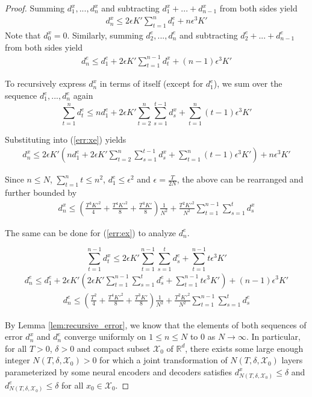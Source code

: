 \documentclass{article}
\def\gX{{\mathcal{X}}}
\newcommand{\R}{\mathbb{R}}
\newcommand{\e}{\epsilon}
\begin{document}
\begin{proof}
Summing $d^x_{1},...,d^x_{n}$ and subtracting $d^x_{1}+...+d^x_{n-1}$ from both sides yield
\begin{align}
d^x_n \leq 2\e K' \sum_{t=1}^n d^e_t + n\e^3K' \label{err:xe}
\end{align}
Note that $d^x_0=0$. 
Similarly, summing $d^e_{2},...,d^e_{n}$ and subtracting $d^e_{2}+...+d^e_{n-1}$ from both sides yield
\begin{align}
d^e_n \leq d^e_1 + 2\e K' \sum_{t=1}^{n-1} d^x_t + (n-1)\e^3K' \label{err:ex}
\end{align}

To recursively express $d^x_n$ in terms of itself (except for $d^e_1$), 
we sum over the sequence $d^e_{1},...,d^e_{n}$ again 
$$\sum_{t=1}^n d^e_t \leq n d^e_1 + 2\e K' \sum_{t=2}^n\sum_{s=1}^{t-1} d^x_s + \sum_{t=1}^n (t-1)\e^3K'$$

Substituting into (\ref{err:xe}) yields
\begin{align}
d^x_n \leq 2\e K' \left(n d^e_1 + 2\e K' \sum_{t=2}^n\sum_{s=1}^{t-1} d^x_s + \sum_{t=1}^n (t-1)\e^3K'\right) + n\e^3K' \nonumber
\end{align}

Since $n\leq N$,
$\sum_{t=1}^n t \leq n^2$,
$d^e_1\leq\e^2$ and $\e=\frac{T}{2N}$, the above can be rearranged and further bounded by
\begin{align}
d^x_n \leq 
\left(
\frac{T^3K'^2}{4} + 
\frac{T^4K'^2}{8} + 
\frac{T^3K'}{8}
\right)\frac{1}{N^2} +
\frac{T^2K'^2}{N^2} \sum_{t=1}^{n-1}\sum_{s=1}^{t} d^x_s 
\end{align}


The same can be done for (\ref{err:ex}) to analyze $d^e_n$. 

$$\sum_{t=1}^{n-1}d^x_t \leq 2\e K'\sum_{t=1}^{n-1}\sum_{s=1}^td^e_s + \sum_{t=1}^{n-1} t\e^3K'$$
\begin{align}
d^e_n \leq d^e_1 + 2\e K' 
\left(
2\e K'\sum_{t=1}^{n-1}\sum_{s=1}^td^e_s + \sum_{t=1}^{n-1} t\e^3K'
\right)
+ (n-1)\e^3K' \nonumber
\end{align}
\begin{align}
d^e_n \leq 
\left(
\frac{T^2}{4} + 
\frac{T^4K'^2}{8} + 
\frac{T^3K'}{8}
\right)\frac{1}{N^2} +
\frac{T^2K'^2}{N^2} \sum_{t=1}^{n-1}\sum_{s=1}^{t} d^e_s 
\end{align}

By Lemma \ref{lem:recursive_error}, we know that the elements of both sequences of error $d^x_n$ and $d^e_n$ converge uniformly on $1\leq n\leq N$ to $0$ as $N\rightarrow\infty$. 
In particular, for all $T>0$, $\delta>0$ and compact subset $\gX_0$ of $\R^d$, there exists some large enough integer $N(T,\delta,\gX_0)>0$ for which a joint transformation of $N(T,\delta,\gX_0)$ layers parameterized by some neural encoders and decoders satisfies
$d^x_{N(T,\delta,\gX_0)} \leq \delta$ and $d^e_{N(T,\delta,\gX_0)} \leq \delta$ for all $x_0\in\gX_0$.



\end{proof}
\end{document}
